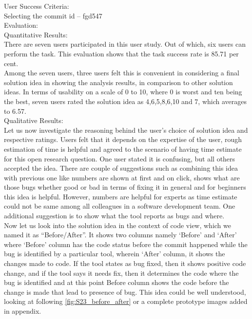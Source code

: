 User Success Criteria: \\

Selecting the commit id – fgd547 \\

Evaluation: \\

Quantitative Results: \\

There are seven users participated in this user study. Out of which, six users can perform the task. This evaluation shows that the task success rate is 85.71 per cent. \\

Among the seven users, three users felt this is convenient in considering a final solution idea in showing the analysis results, in comparison to other solution ideas. In terms of usability on a scale of 0 to 10, where 0 is worst and ten being the best, seven users rated the solution idea as 4,6,5,8,6,10 and 7, which averages to 6.57. \\

Qualitative Results: \\

Let us now investigate the reasoning behind the user’s choice of solution idea and respective ratings. Users felt that it depends on the expertise of the user, rough estimation of time is helpful and agreed to the scenario of having time estimate for this open research question. One user stated it is confusing, but all others accepted the idea. There are couple of suggestions such as combining this idea with previous one like numbers are shown at first and on click, shows what are those bugs whether good or bad in terms of fixing it in general and for beginners this idea is helpful. However, numbers are helpful for experts as time estimate could not be same among all colleagues in a software development team. One additional suggestion is to show what the tool reports as bugs and where. \\

Now let us look into the solution idea in the context of code view, which we named it as “Before/After”. It shows two columns namely ‘Before’ and ‘After’ where ‘Before’ column has the code status before the commit happened while the bug is identified by a particular tool, wherein ‘After’ column, it shows the changes made to code. If the tool states as bug fixed, then it shows positive code change, and if the tool says it needs fix, then it determines the code where the bug is identified and at this point Before column shows the code before the change is made that lead to presence of bug. This idea could be well understood, looking at following \autoref{fig:S23_before_after} or a complete prototype images added in appendix. \\ \\

